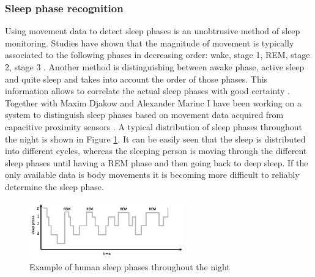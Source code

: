 \subsubsection{Sleep phase recognition}
Using movement data to detect sleep phases is an unobtrusive method of sleep monitoring. Studies have shown that the magnitude of movement is typically associated to the following phases in decreasing order: wake, stage 1, REM, stage 2, stage 3 \cite{wilde1983movement}. Another method is distinguishing between awake phase, active sleep and quite sleep and takes into account the order of those phases. This information allows to correlate the actual sleep phases with good certainty \cite{salmi86}. Together with Maxim Djakow and Alexander Marinc I have been working on a system to distinguish sleep phases based on movement data acquired from capacitive proximity sensors \cite{Djakow2013movibed}. 
A typical distribution of sleep phases throughout the night is shown in Figure \ref{fig:proc_phys_sleepphase}. It can be easily seen that the sleep is distributed into different cycles, whereas the sleeping person is moving through the different sleep phases until having a REM phase and then going back to deep sleep. If the only available data is body movements it is becoming more difficult to reliably determine the sleep phase.

\begin{figure}[ht]
\centering
\includegraphics[width=0.6\textwidth]{images/proc_phys_sleepphase}
\caption{Example of human sleep phases throughout the night}
\label{fig:proc_phys_sleepphase}
\end{figure}

